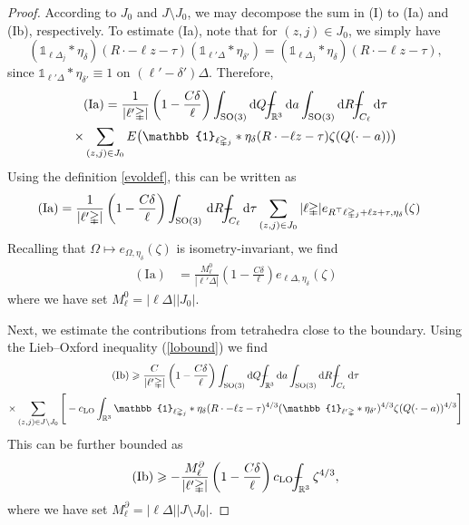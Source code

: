 \documentclass[final,onefignum,onetabnum,reqno]{amsart}
\theoremstyle{remark}
\renewcommand{\ge}{\geqslant}
\newcommand{\RR}{\mathbb{R}}
\newcommand{\SO}{\mathrm{SO}}
\newcommand{\LO}{\mathrm{LO}} %
\newcommand{\iden}{\mathbb{1}} %
\newcommand{\tetra}{\mathbb{\Delta}} %
\newcommand{\dd}{\mathrm{d}} %
\def\Xint#1{\mathchoice
{\XXint\displaystyle\textstyle{#1}}%
{\XXint\textstyle\scriptstyle{#1}}%
{\XXint\scriptstyle\scriptscriptstyle{#1}}%
{\XXint\scriptscriptstyle\scriptscriptstyle{#1}}%
\!\int}
\def\XXint#1#2#3{{\setbox0=\hbox{$#1{#2#3}{\int}$ }
\vcenter{\hbox{$#2#3$ }}\kern-.6\wd0}}
\def\dashint{\Xint-}
\begin{document}
\begin{proof}
According to $J_0$ and $J\setminus J_0$, we may decompose the sum in (I) to (Ia) and (Ib), respectively. 
To estimate (Ia), note that for $(z,j)\in J_0$, we simply have
$$
(\iden_{\ell\tetra_j}*\eta_\delta)(R\cdot - \ell z - \tau)(\iden_{\ell'\tetra}*\eta_{\delta'})=(\iden_{\ell\tetra_j}*\eta_\delta)(R\cdot - \ell z - \tau),
$$
since $\iden_{\ell'\tetra}*\eta_{\delta'}\equiv 1$ on $(\ell'-\delta')\tetra$. Therefore,
\begin{multline*}
\mathrm{(Ia)}= \frac{1}{|\ell'\tetra|} \left(1-\frac{C\delta}{\ell}\right) \int_{\SO(3)}\dd Q  \dashint_{\RR^3} \dd a \int_{\SO(3)}\dd R\dashint_{C_{\ell}}\dd\tau \\
\times \sum_{(z,j)\in J_0} E\bigl(\iden_{\ell\tetra_j}*\eta_\delta(R\cdot - \ell z - \tau)\zeta(Q(\cdot-a))\bigr)
\end{multline*}
Using the definition \cref{evoldef}, this can be written as
\begin{align*}
\mathrm{(Ia)}&= \frac{1}{|\ell'\tetra|} \left(1-\frac{C\delta}{\ell}\right)   \int_{\SO(3)}\,\dd R\dashint_{C_{\ell}}\dd\tau \sum_{(z,j)\in J_0} |\ell\tetra|e_{R^\top\ell\tetra_j+\ell z+\tau,\eta_\delta}(\zeta)
\end{align*}
Recalling that $\Omega\mapsto e_{\Omega,\eta_\delta}(\zeta)$ is isometry-invariant, we find
\begin{align*}
\mathrm{(Ia)}&= \frac{M_\ell^0}{|\ell'\tetra|} \left(1-\frac{C\delta}{\ell}\right)  e_{\ell\tetra,\eta_\delta}(\zeta)
\end{align*}
where we have set $M_\ell^0=|\ell\tetra||J_0|$.

Next, we estimate the contributions from tetrahedra close to the boundary. 
Using the Lieb--Oxford inequality (\cref{lobound}) we find
\begin{multline*}
\mathrm{(Ib)}\ge \frac{C}{|\ell'\tetra|} \left(1-\frac{C\delta}{\ell}\right) \int_{\SO(3)}\dd Q \dashint_{\RR^3} \dd a \int_{\SO(3)}\dd R  \dashint_{C_{\ell}}\dd\tau \\
\times\sum_{(z,j)\in J\setminus J_0}\Bigg[
-c_\LO \int_{\RR^3} \iden_{\ell\tetra_j}*\eta_\delta(R\cdot - \ell z - \tau)^{4/3}(\iden_{\ell'\tetra}*\eta_{\delta'})^{4/3} \zeta(Q(\cdot -a))^{4/3}\Bigg] 
\end{multline*}
This can be further bounded as
$$
\mathrm{(Ib)}\ge - \frac{M_\ell^\partial}{|\ell'\tetra|} \left(1-\frac{C\delta}{\ell}\right)  c_\LO \dashint_{\RR^3} \zeta^{4/3},
$$
where we have set $M_\ell^\partial=|\ell\tetra||J\setminus J_0|$. 


\end{proof}
\end{document}
